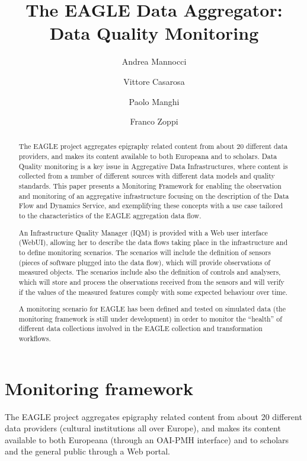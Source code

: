 \documentclass[amsthm,ebook]{saparticle}
\title{The EAGLE Data Aggregator:
Data Quality Monitoring}
\author[CNR-ISTI]{Andrea Mannocci\corref{all}}
\author[CNR-ISTI]{Vittore Casarosa\corref{all}}
\author[CNR-ISTI]{Paolo Manghi\corref{all}}
\author[CNR-ISTI]{Franco Zoppi\corref{all}}
\begin{document}
\maketitle

\begin{abstract}
The EAGLE project aggregates epigraphy related content from about 20 different data providers, and makes its content available to both Europeana and to scholars. Data Quality monitoring is a key issue in Aggregative Data Infrastructures, where content is collected from a number of different sources with different data models and quality standards. This paper presents a Monitoring Framework for enabling the observation and monitoring of an aggregative infrastructure focusing on the description of the Data Flow and Dynamics Service, and exemplifying these concepts with a use case tailored to the characteristics of the EAGLE aggregation data flow.

An Infrastructure Quality Manager (IQM) is provided with a Web user interface (WebUI), allowing her to describe the data flows taking place in the infrastructure and to define monitoring scenarios. The scenarios will include the definition of sensors (pieces of software plugged into the data flow), which will provide observations of measured objects. The scenarios include also the definition of controls and analysers, which will store and process the observations received from the sensors and will verify if the values of the measured features comply with some expected behaviour over time. 

A monitoring scenario for EAGLE has been defined and tested on simulated data (the monitoring framework is still under development) in order to monitor the ``health'' of different data collections involved in the EAGLE collection and transformation workflows.  

\end{abstract}


\section{Monitoring framework}\label{framework}

\noindent The EAGLE project \citep[fully described in][]{eagle} aggregates epigraphy related content from about 20 different data providers (cultural institutions all over Europe), and makes its content available to both Europeana \citep{europeana} (through an OAI-PMH interface) and to scholars and the general public through a Web portal.
\end{document}
